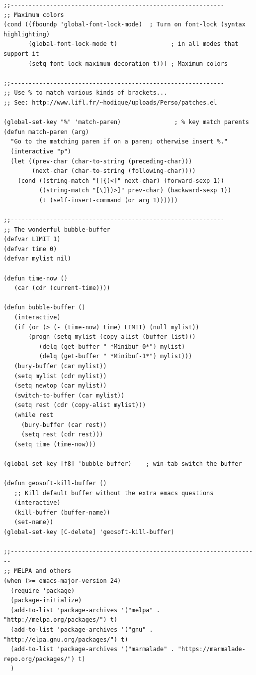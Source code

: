 \documentclass[12pt,spanish,]{scrartcl}
\begin{document}
\begin{verbatim}
;;------------------------------------------------------------
;; Maximum colors
(cond ((fboundp 'global-font-lock-mode)  ; Turn on font-lock (syntax highlighting)
       (global-font-lock-mode t)               ; in all modes that support it
       (setq font-lock-maximum-decoration t))) ; Maximum colors

;;------------------------------------------------------------
;; Use % to match various kinds of brackets...
;; See: http://www.lifl.fr/~hodique/uploads/Perso/patches.el

(global-set-key "%" 'match-paren)               ; % key match parents
(defun match-paren (arg)
  "Go to the matching paren if on a paren; otherwise insert %."
  (interactive "p")
  (let ((prev-char (char-to-string (preceding-char)))
        (next-char (char-to-string (following-char))))
    (cond ((string-match "[[{(<]" next-char) (forward-sexp 1))
          ((string-match "[\]})>]" prev-char) (backward-sexp 1))
          (t (self-insert-command (or arg 1))))))

;;------------------------------------------------------------
;; The wonderful bubble-buffer
(defvar LIMIT 1)
(defvar time 0)
(defvar mylist nil)

(defun time-now ()
   (car (cdr (current-time))))

(defun bubble-buffer ()
   (interactive)
   (if (or (> (- (time-now) time) LIMIT) (null mylist))
       (progn (setq mylist (copy-alist (buffer-list)))
          (delq (get-buffer " *Minibuf-0*") mylist)
          (delq (get-buffer " *Minibuf-1*") mylist)))
   (bury-buffer (car mylist))
   (setq mylist (cdr mylist))
   (setq newtop (car mylist))
   (switch-to-buffer (car mylist))
   (setq rest (cdr (copy-alist mylist)))
   (while rest
     (bury-buffer (car rest))
     (setq rest (cdr rest)))
   (setq time (time-now))) 

(global-set-key [f8] 'bubble-buffer)    ; win-tab switch the buffer

(defun geosoft-kill-buffer ()
   ;; Kill default buffer without the extra emacs questions
   (interactive)
   (kill-buffer (buffer-name))
   (set-name)) 
(global-set-key [C-delete] 'geosoft-kill-buffer) 

;;----------------------------------------------------------------------
;; MELPA and others
(when (>= emacs-major-version 24)
  (require 'package)
  (package-initialize)
  (add-to-list 'package-archives '("melpa" . "http://melpa.org/packages/") t)
  (add-to-list 'package-archives '("gnu" . "http://elpa.gnu.org/packages/") t)
  (add-to-list 'package-archives '("marmalade" . "https://marmalade-repo.org/packages/") t)
  )


\end{verbatim}
\end{document}
